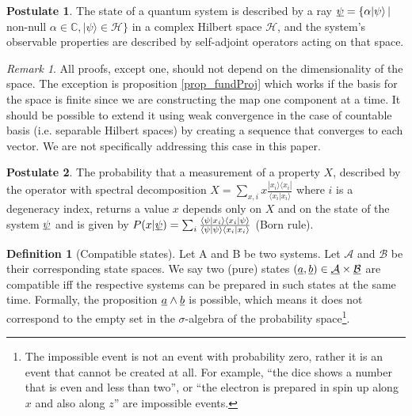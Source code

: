 \documentclass[aps,prl,amsmath,amssymb,twocolumn,nofootinbib]{revtex4}
\theoremstyle{plain}
\theoremstyle{definition}
\newtheorem{defn}[thrm]{Definition}
\newtheorem{post}{Postulate}[]
\theoremstyle{remark}
\newtheorem*{remark}{Remark}
\newcommand{\pj}[1] {\underbar{$#1$}}
\def\>{\rangle}
\def\<{\langle}
\begin{document}
	
	\begin{post}\label{post_state}
		The state of a quantum system is described by a ray $\pj{\psi} = \{
		\alpha |\psi\> \, |$ non-null $\alpha \in
		\mathbb{C},|\psi\>\in\mathcal{H}\}$ in a complex Hilbert space
		$\mathcal{H}$, and the system's observable properties are described
		by self-adjoint operators acting on that space. %
	\end{post}
	
	\begin{remark}
		All proofs, except one, should not depend on the dimensionality of
		the space. The exception is proposition \ref{prop_fundProj} which
		works if the basis for the space is finite since we are constructing
		the map one component at a time. It should be possible to extend it
		using weak convergence in the case of countable basis
		(i.e. separable Hilbert spaces) by creating a sequence that
		converges to each vector. We are not specifically addressing this
		case in this paper.
	\end{remark}
	
	\begin{post}\label{post_measurements}
		The probability that a measurement of a property $X$, described by the operator with
		spectral decomposition $X = \sum_{x,i }x \frac{| x_i \> \< x_i |}{\< x_i | x_i \>}$  where $i$ is a degeneracy index, returns a value $x$ depends only on $X$ and on the state of the system $\pj{\psi}$ and is given by $P(x|\pj{\psi})=\sum_i \frac{\<\psi| x_i \> \< x_i |\psi\>}{\< \psi | \psi \>\< x_i | x_i \>}$
		(Born rule).\end{post}
	
	
	\begin{defn}[Compatible states]\label{def_compatible}
		Let A and B be two systems. Let ${\mathcal{A}}$ and ${\mathcal{B}}$
		be their corresponding state spaces. We say two (pure) states $(\pj{a},
		\pj{b}) \in \pj{\mathcal{A}} \times \pj{\mathcal{B}}$ are compatible
		iff the respective systems can be prepared in such states at the
		same time. Formally, the proposition $\pj{a} \wedge \pj{b}$ is
		possible, which means it does not correspond to the empty set in the
		$\sigma$-algebra of the probability space\footnote{The impossible event is not an event with probability zero, rather it is an event that cannot be created at all. For example, ``the dice shows a number that is even and less than two'', or ``the electron is prepared in spin up along $x$ and also along $z$'' are impossible events.}.
	\end{defn}
	
\end{document}
